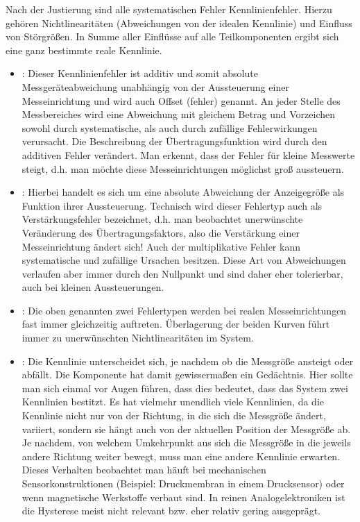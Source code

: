 \documentclass[letterpaper,10pt,english]{jupyterBook}
\begin{document}
\sphinxAtStartPar
Nach der Justierung sind alle systematischen Fehler Kennlinienfehler. Hierzu gehören Nichtlinearitäten (Abweichungen von der idealen Kennlinie) und Einfluss von Störgrößen. In Summe aller Einflüsse auf alle Teilkomponenten ergibt sich eine ganz bestimmte reale Kennlinie.
\begin{itemize}
\item {} 
\sphinxAtStartPar
{}: Dieser Kennlinienfehler ist additiv und somit absolute Messgeräteabweichung unabhängig von der Aussteuerung einer Messeinrichtung und wird auch Offset (\sphinxhyphen{}fehler) genannt. An jeder Stelle des Messbereiches wird eine Abweichung mit gleichem Betrag und Vorzeichen sowohl durch systematische, als auch durch zufällige Fehlerwirkungen verursacht. Die Beschreibung der  Übertragungsfunktion wird durch den additiven Fehler verändert. Man erkennt, dass der  Fehler für kleine Messwerte steigt, d.h. man möchte diese Messeinrichtungen möglichst groß aussteuern.

\item {} 
\sphinxAtStartPar
{}: Hierbei handelt es sich um eine absolute Abweichung der Anzeigegröße als Funktion ihrer Aussteuerung. Technisch wird dieser Fehlertyp auch als Verstärkungsfehler bezeichnet, d.h. man beobachtet unerwünschte Veränderung des Übertragungsfaktors, also die Verstärkung einer Messeinrichtung ändert sich! Auch der multiplikative Fehler kann systematische und zufällige Ursachen besitzen. Diese Art von Abweichungen verlaufen aber immer durch den Nullpunkt und sind daher eher tolerierbar, auch bei kleinen Aussteuerungen.

\item {} 
\sphinxAtStartPar
{}: Die oben genannten zwei Fehlertypen werden bei realen Messeinrichtungen fast immer gleichzeitig auftreten. Überlagerung der beiden Kurven führt immer zu unerwünschten Nichtlinearitäten im System.

\item {} 
\sphinxAtStartPar
{}: Die Kennlinie unterscheidet sich, je nachdem ob die Messgröße ansteigt oder abfällt. Die Komponente hat damit gewissermaßen ein Gedächtnis. Hier sollte man sich einmal vor Augen führen, dass dies  bedeutet, dass das System zwei Kennlinien bestitzt. Es hat vielmehr unendlich viele Kennlinien, da die Kennlinie nicht nur von der Richtung, in die sich die Messgröße ändert, variiert, sondern sie hängt auch von der aktuellen Position der Messgröße ab. Je nachdem, von welchem Umkehrpunkt aus sich die Messgröße in die jeweils andere Richtung weiter bewegt, muss man eine andere Kennlinie erwarten. Dieses Verhalten beobachtet man häuft bei mechanischen Sensorkonstruktionen (Beispiel: Druckmembran in einem Drucksensor) oder wenn magnetische Werkstoffe verbaut sind. In reinen Analogelektroniken ist die Hysterese meist nicht relevant bzw. eher relativ gering ausgeprägt.

\end{itemize}
\end{document}
